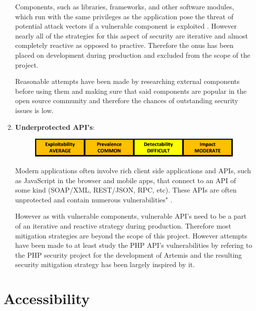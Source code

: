 \begin{enumerate}
    Components, such as libraries, frameworks, and other software modules, which run with the same privileges as the application pose the threat of potential attack vectors if a vulnerable component is exploited  \cite{OWASP2017}. However nearly all of the strategies for this aspect of security are iterative and almost completely reactive as opposed to practive. Therefore the onus has been placed on development during production and excluded from the scope of the project.
    
    Reasonable attempts have been made by researching external components before using them and making sure that said components are popular in the open source community and therefore the chances of outstanding security issues is low.
    
    \item \textbf{Underprotected API's}:
    
    \begin{figure}[h]
    	\centering
    	\includegraphics[scale=0.5,center]{chapters/chapter03/figures/api.png}
    	\label{Underprotected API}
    \end{figure}

        
    Modern applications often involve rich client side applications and APIs, such as JavaScript in the browser and mobile apps, that connect to an API of some kind (SOAP/XML, REST/JSON, RPC, etc)\cite{OWASP2017}. These APIs are often unprotected and contain numerous vulnerabilities" \cite{OWASP2017}.
    
    However as with vulnerable components, vulnerable API's need to be a part of an iterative and reactive strategy during production. Therefore most mitigation strategies are beyond the scope of this project. However attempts have been made to at least study the PHP API's vulnerabilities by refering to the PHP security project  for the development of Artemis and the resulting security mitigation strategy has been largely inspired by it.
    
\end{enumerate}



\newpage
\section{Accessibility}

